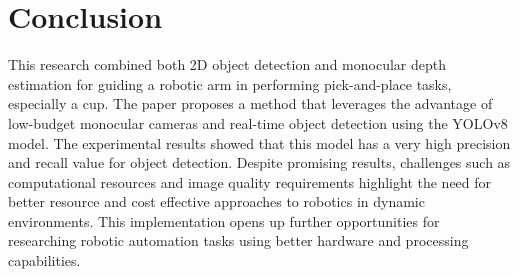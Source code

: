 \section{Conclusion}

This research combined both 2D object detection and monocular depth estimation for guiding a robotic arm in performing pick-and-place tasks, especially a cup. The paper proposes a method that leverages the advantage of low-budget monocular cameras and real-time object detection using the YOLOv8 model. The experimental results showed that  this model has a very high precision and recall value for object detection. Despite promising results, challenges such as computational resources and image quality requirements highlight the need for better resource and cost effective approaches to robotics in dynamic environments. This implementation opens up further opportunities for researching robotic automation tasks using better hardware and processing capabilities.


